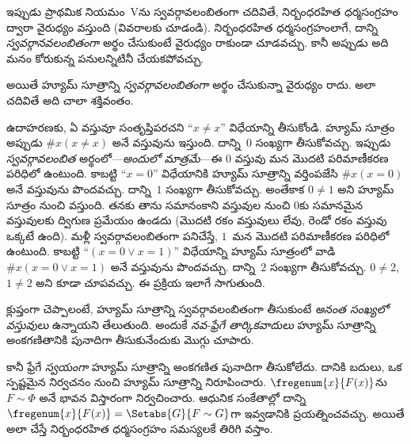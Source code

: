 \documentclass[../../../include/open-logic-section]{subfiles}
\begin{document}
ఇప్పుడు ప్రాథమిక నియమం~Vను స్వవర్గావలంబితంగా చదివితే, నిర్బంధరహిత ధర్మసంగ్రహం ద్వారా వైరుధ్యం వస్తుంది (వివరాలకు  చూడండి). నిర్బంధరహిత ధర్మసంగ్రహంలాగే, దాన్ని \emph{స్వవర్గానవలంబితంగా} అర్థం చేసుకుంటే వైరుధ్యం రాకుండా చూడవచ్చు. కానీ అప్పుడు అది మనం కోరుకున్న పనులన్నిటినీ చేయకపోవచ్చు.

అయితే హ్యూమ్ సూత్రాన్ని \emph{స్వవర్గావలంబితంగా} అర్థం చేసుకున్నా వైరుధ్యం రాదు. అలా చదివితే అది చాలా శక్తివంతం.

ఉదాహరణకు, ఏ వస్తువూ సంతృప్తిపరచని ``$x \neq x$'' విధేయాన్ని తీసుకోండి. హ్యూమ్ సూత్రం అప్పుడు $\# x( x\neq
x)$ అనే వస్తువును ఇస్తుంది. దాన్ని~$0$ సంఖ్యగా తీసుకోవచ్చు. ఇప్పుడు \emph{స్వవర్గావలంబిత} అర్థంలో---\emph{అందులో మాత్రమే}---ఈ $0$ వస్తువు మన మొదటి పరిమాణీకరణ పరిధిలో ఉంటుంది. కాబట్టి ``$x = 0$'' విధేయానికి హ్యూమ్ సూత్రాన్ని వర్తింపజేసి $\#x (x =
0)$ అనే వస్తువును పొందవచ్చు. దాన్ని~$1$ సంఖ్యగా తీసుకోవచ్చు. అంతేకాక $0 \neq 1$ అని హ్యూమ్ సూత్రం నుంచి వస్తుంది. తనకు తాను సమానంకాని వస్తువుల నుంచి $0$కు సమానమైన వస్తువులకు ద్విగుణ ప్రమేయం ఉండదు (మొదటి రకం వస్తువులు లేవు, రెండో రకం వస్తువు ఒక్కటే ఉంది). మళ్లీ స్వవర్గావలంబితంగా పనిచేస్తే, $1$~మన మొదటి పరిమాణీకరణ పరిధిలో ఉంటుంది. కాబట్టి ``$(x = 0 \lor x = 1)$'' విధేయాన్ని హ్యూమ్ సూత్రంలో వాడి $\#x(x = 0 \lor
x = 1)$ అనే వస్తువును పొందవచ్చు. దాన్ని~$2$ సంఖ్యగా తీసుకోవచ్చు. $0\neq 2$, $1 \neq 2$ అని కూడా చూపవచ్చు. ఈ ప్రక్రియ ఇలాగే సాగుతుంది.

క్లుప్తంగా చెప్పాలంటే, హ్యూమ్ సూత్రాన్ని స్వవర్గావలంబితంగా
తీసుకుంటే \emph{అనంత సంఖ్యలో వస్తువులు} ఉన్నాయని
తేలుతుంది. అందుకే \emph{నవ-ఫ్రేగే తార్కికవాదులు}
హ్యూమ్ సూత్రాన్ని అంకగణితానికి పునాదిగా తీసుకునేందుకు మొగ్గు చూపారు.

కానీ ఫ్రేగే \emph{స్వయంగా} హ్యూమ్ సూత్రాన్ని అంకగణిత పునాదిగా తీసుకోలేదు. దానికి బదులు, ఒక స్పష్టమైన నిర్వచనం నుంచి హ్యూమ్ సూత్రాన్ని నిరూపించారు. $\fregenum{x}{F(x)}$ను $F \sim \Phi$ అనే భావన విస్తారంగా నిర్వచించారు. ఆధునిక సంకేతాల్లో దాన్ని $\fregenum{x}{F(x)} = \Setabs{G}{F \sim G}$గా ఇవ్వడానికి ప్రయత్నించవచ్చు. అయితే అలా చేస్తే నిర్బంధరహిత ధర్మసంగ్రహం సమస్యలకే తిరిగి వస్తాం.
\end{document}
